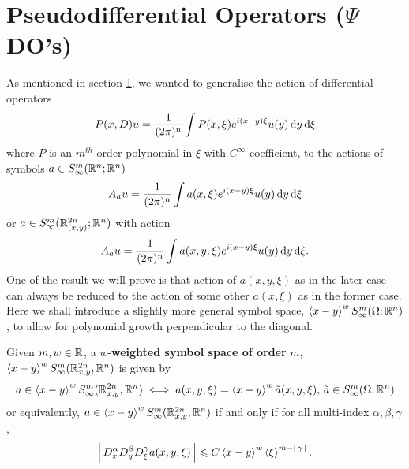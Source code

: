 \documentclass[12pt]{article}
\begin{document}
\section{Pseudodifferential Operators ($\Psi$DO's)}
As mentioned in section \ref{}, we wanted to generalise the action of differential operators 
\begin{align*}
P(x, D) u = \frac{1}{(2\pi)^n} \int P(x, \xi) e^{i (x - y)\xi} u(y) \d[y] \d[\xi]
\end{align*}
where $P$ is an $m^{th}$ order polynomial in $\xi$ with $C^\infty$ coefficient, to the actions of symbols $a \in S^{m}_\infty(\R^n; \R^n)$
\begin{align*}
A_a u = \frac{1}{(2\pi)^n} \int a(x, \xi) e^{i (x - y)\xi} u(y) \d[y] \d[\xi]
\end{align*}
or $a \in S^{m}_\infty(\R^{2n}_{(x, y)}; \R^n)$ with action 
\begin{align*}
A_a u = \frac{1}{(2\pi)^n} \int a(x, y, \xi) e^{i (x - y)\xi} u(y) \d[y] \d[\xi]. 
\end{align*}
One of the result we will prove is that action of $a(x, y, \xi)$ as in the later case can always be reduced to the action of some other $a(x, \xi)$ as in the former case. \\


Here we shall introduce a slightly more general symbol space, $\sym[x-y]^w S^{m}_\infty(\Omega; \R^n)$, to allow for polynomial growth perpendicular to the diagonal. 
\begin{fdefinition}
    Given $m, w \in \R$, a $w$-\textbf{weighted symbol space of order} $m$, $\sym[x - y]^w S^{m}_\infty(\R^{2n}_{x,y}, \R^n) $ is given by 
    \begin{align*}
    a \in \sym[x - y]^w S^{m}_\infty(\R^{2n}_{x,y}, \R^n) \iff a(x, y, \xi) = \sym[x - y]^w \tilde{a}(x, y, \xi), \, \tilde{a} \in S^{m}_\infty(\Omega; \R^n)
    \end{align*}
    or equivalently, $a \in \sym[x - y]^w S^{m}_\infty(\R^{2n}_{x,y}, \R^n) $ if and only if for all multi-index $\alpha, \beta, \gamma$, 
    \begin{align*}
    \abs{D^\alpha_x D^\beta_yD^\gamma_\xi a(x, y, \xi)} \leq C \sym[x - y]^w \sym[\xi]^{m - \abs{\gamma}}. 
    \end{align*}
\end{fdefinition}
\end{document}
